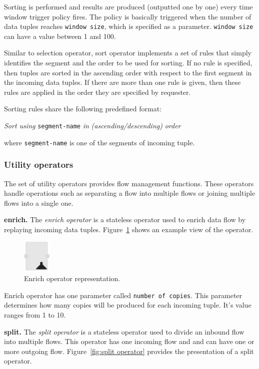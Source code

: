 Sorting is performed and results are produced (outputted one by one) every time 
window trigger policy fires. The policy is basically triggered when the number of 
data tuples reaches \texttt{window size}, which is specified as a parameter. 
\texttt{window size} can have a value between 1 and 100.

Similar to selection operator, sort operator implements a set of rules that simply 
identifies the segment and the order to be used for sorting. If no rule is specified, 
then tuples are sorted in the ascending order with respect to the first segment in 
the incoming data tuples. If there are more than one rule is given, then these rules 
are applied in the order they are specified by requester.

Sorting rules share the following predefined format:

\textit{Sort using} \texttt{segment-name} \textit{in} \textit{(ascending/descending)} \textit{order}

where \texttt{segment-name} is one of the segments of incoming tuple.

\subsubsection{Utility operators}
\label{sec:utility operators}
The set of utility operators provides flow management functions. These operators 
handle operations such as separating a flow into multiple flows or joining multiple 
flows into a single one.

\textbf{enrich.}
The \textit{enrich operator} is a stateless operator used to enrich data flow by 
replaying incoming data tuples. Figure~\ref{fig:enrich operator} shows an example 
view of the operator.

\begin{figure}[ht]
	\centering
	\includegraphics[height=60px]{figures/EnrichOperator.pdf}
	\caption{Enrich operator representation.}
	\label{fig:enrich operator}
\end{figure}

Enrich operator has one parameter called \texttt{number of copies}. This parameter 
determines how many copies will be produced for each incoming tuple. It's value 
ranges from 1 to 10.

\textbf{split.}
The \textit{split operator} is a stateless operator used to divide an inbound flow 
into multiple flows. This operator has one incoming flow and and can have one or 
more outgoing flow. Figure~\ref{fig:split operator} provides the presentation of a 
split operator.

